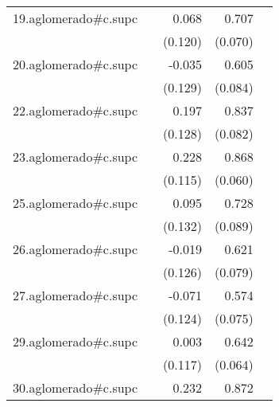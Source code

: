 {\begin{longtable}{l*{4}{D{.}{.}{-1}}}
\addlinespace
19.aglomerado#c.supc&                     &       0.068         &       0.707\sym{***}&                     \\
            &                     &     (0.120)         &     (0.070)         &                     \\
\addlinespace
20.aglomerado#c.supc&                     &      -0.035         &       0.605\sym{***}&                     \\
            &                     &     (0.129)         &     (0.084)         &                     \\
\addlinespace
22.aglomerado#c.supc&                     &       0.197         &       0.837\sym{***}&                     \\
            &                     &     (0.128)         &     (0.082)         &                     \\
\addlinespace
23.aglomerado#c.supc&                     &       0.228\sym{*}  &       0.868\sym{***}&                     \\
            &                     &     (0.115)         &     (0.060)         &                     \\
\addlinespace
25.aglomerado#c.supc&                     &       0.095         &       0.728\sym{***}&                     \\
            &                     &     (0.132)         &     (0.089)         &                     \\
\addlinespace
26.aglomerado#c.supc&                     &      -0.019         &       0.621\sym{***}&                     \\
            &                     &     (0.126)         &     (0.079)         &                     \\
\addlinespace
27.aglomerado#c.supc&                     &      -0.071         &       0.574\sym{***}&                     \\
            &                     &     (0.124)         &     (0.075)         &                     \\
\addlinespace
29.aglomerado#c.supc&                     &       0.003         &       0.642\sym{***}&                     \\
            &                     &     (0.117)         &     (0.064)         &                     \\
\addlinespace
30.aglomerado#c.supc&                     &       0.232         &       0.872\sym{***}&                     \\

\end{longtable}}
